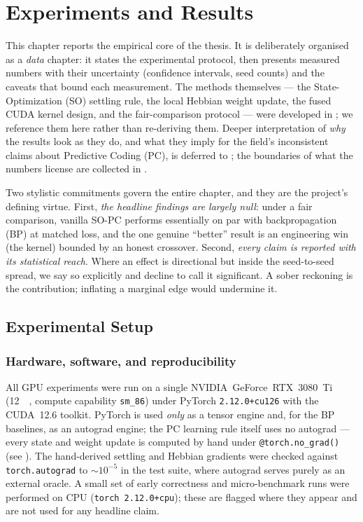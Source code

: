 \chapter{Experiments and Results}\label{ch:experiments}

This chapter reports the empirical core of the thesis. It is deliberately organised as a
\emph{data} chapter: it states the experimental protocol, then presents measured numbers with
their uncertainty (confidence intervals, seed counts) and the caveats that bound each
measurement. The methods themselves --- the State-Optimization (SO) settling rule, the local
Hebbian weight update, the fused CUDA kernel design, and the fair-comparison protocol --- were
developed in ; we reference them here rather than re-deriving them. Deeper
interpretation of \emph{why} the results look as they do, and what they imply for the field's
inconsistent claims about Predictive Coding (PC), is deferred to ; the
boundaries of what the numbers license are collected in .

Two stylistic commitments govern the entire chapter, and they are the project's defining virtue.
First, \emph{the headline findings are largely null}: under a fair comparison, vanilla SO-PC
performs essentially on par with backpropagation (BP) at matched loss, and the one genuine
``better'' result is an engineering win (the kernel) bounded by an honest crossover. Second,
\emph{every claim is reported with its statistical reach}. Where an effect is directional but
inside the seed-to-seed spread, we say so explicitly and decline to call it significant. A sober
reckoning is the contribution; inflating a marginal edge would undermine it.

\section{Experimental Setup}

\subsection{Hardware, software, and reproducibility}

All GPU experiments were run on a single \mbox{NVIDIA GeForce RTX 3080 Ti} (\SI{12}{\giga\byte},
compute capability \texttt{sm\_86}) under PyTorch \texttt{2.12.0+cu126} with the CUDA~12.6
toolkit. PyTorch is used \emph{only} as a tensor engine and, for the BP baselines, as an autograd
engine; the PC learning rule itself uses no autograd --- every state and weight update is computed
by hand under \texttt{@torch.no\_grad()} (see ). The hand-derived settling and
Hebbian gradients were checked against \texttt{torch.autograd} to \(\sim\!10^{-5}\) in the test
suite, where autograd serves purely as an external oracle. A small set of early correctness and
micro-benchmark runs were performed on CPU (\texttt{torch 2.12.0+cpu}); these are flagged where
they appear and are not used for any headline claim.

